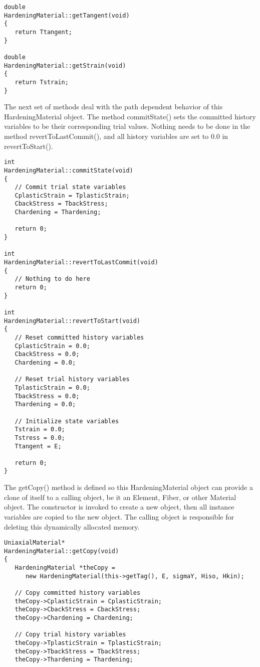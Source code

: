 \documentclass[12pt]{article}
\begin{document}
{{\begin{verbatim}
double 
HardeningMaterial::getTangent(void)
{
   return Ttangent;
}

double 
HardeningMaterial::getStrain(void)
{
   return Tstrain;
}
\end{verbatim}
}

\noindent The next set of methods deal with the path dependent behavior of this
HardeningMaterial object. The method commitState() sets the committed history variables
to be their corresponding trial values. Nothing needs to be done in the method
revertToLastCommit(), and all history variables are set to $0.0$ in
revertToStart().

{\sf\small
\begin{verbatim}
int 
HardeningMaterial::commitState(void)
{
   // Commit trial state variables
   CplasticStrain = TplasticStrain;
   CbackStress = TbackStress;
   Chardening = Thardening;

   return 0;
}

int 
HardeningMaterial::revertToLastCommit(void)
{
   // Nothing to do here
   return 0;
}

int 
HardeningMaterial::revertToStart(void)
{
   // Reset committed history variables
   CplasticStrain = 0.0;
   CbackStress = 0.0;
   Chardening = 0.0;

   // Reset trial history variables
   TplasticStrain = 0.0;
   TbackStress = 0.0;
   Thardening = 0.0;

   // Initialize state variables
   Tstrain = 0.0;
   Tstress = 0.0;
   Ttangent = E;

   return 0;
}
\end{verbatim}
}

\noindent The getCopy() method is defined so this HardeningMaterial object can
provide a clone of itself to a calling object, be it an Element, Fiber, or other
Material object. The constructor is invoked to create a new object, then all
instance variables are copied to the new object. The calling object is responsible
for deleting this dynamically allocated memory.

{\sf\small
\begin{verbatim}
UniaxialMaterial*
HardeningMaterial::getCopy(void)
{
   HardeningMaterial *theCopy = 
      new HardeningMaterial(this->getTag(), E, sigmaY, Hiso, Hkin);

   // Copy committed history variables
   theCopy->CplasticStrain = CplasticStrain;
   theCopy->CbackStress = CbackStress;
   theCopy->Chardening = Chardening;

   // Copy trial history variables
   theCopy->TplasticStrain = TplasticStrain;
   theCopy->TbackStress = TbackStress;
   theCopy->Thardening = Thardening;


\end{verbatim}}}
\end{document}
